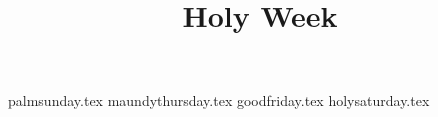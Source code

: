 \documentclass[letterpaper]{report}
\title{Holy Week}
\begin{document}
\maketitle

{palmsunday.tex}
{maundythursday.tex}
{goodfriday.tex}
{holysaturday.tex}

\printbibliography
\end{document}
